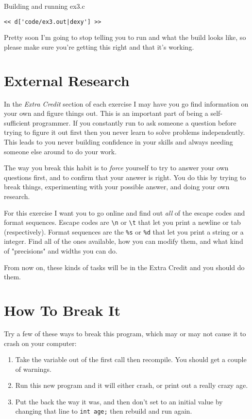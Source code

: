\begin{Terminal}{Building and running ex3.c}
\begin{lstlisting}
<< d['code/ex3.out|dexy'] >>
\end{lstlisting}
\end{Terminal}

Pretty soon I'm going to stop telling you to run  and what
the build looks like, so please make sure you're getting this right
and that it's working.

\section{External Research}

In the \emph{Extra Credit} section of each exercise I may have you go
find information on your own and figure things out.  This is an important
part of being a self-sufficient programmer.  If you constantly run to
ask someone a question before trying to figure it out first then you
never learn to solve problems independently.  This leads to you never
building confidence in your skills and always needing someone else
around to do your work.

The way you break this habit is to \emph{force} yourself to try to answer
your own questions first, and to confirm that your answer is right.  You
do this by trying to break things, experimenting with your possible answer,
and doing your own research.

For this exercise I want you to go online and find out \emph{all} of the
 escape codes and format sequences.  Escape codes are 
\verb|\n| or \verb|\t| that let you print a newline or tab (respectively).
Format sequences are the \verb|%s| or \verb|%d| that let you print a 
string or a integer.  Find all of the ones available, how you can
modify them, and what kind of "precisions" and widths you can do.

From now on, these kinds of tasks will be in the Extra Credit and you
should do them.

\section{How To Break It}

Try a few of these ways to break this program, which may or may
not cause it to crash on your computer:

\begin{enumerate}
\item Take the  variable out of the first  call
    then recompile. You should get a couple of warnings.
\item Run this new program and it will either crash, or print out a really
    crazy age.
\item Put the  back the way it was, and then don't set 
    to an initial value by changing that line to \verb|int age;| then
    rebuild and run again.
\end{enumerate}


